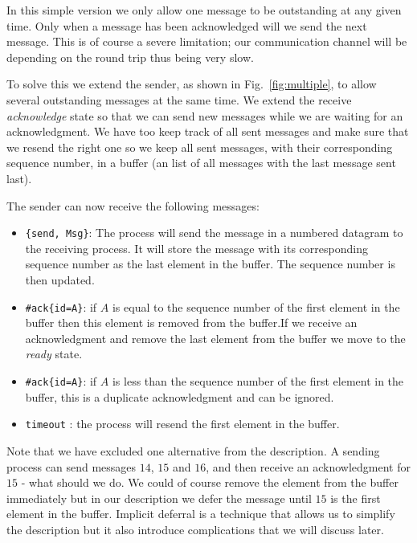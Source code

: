 \documentclass[a4paper,11pt]{article}
\begin{document}
In this simple version we only allow one message to be outstanding at
any given time. Only when a message has been acknowledged will we send
the next message. This is of course a severe limitation; our
communication channel will be depending on the round trip thus being
very slow.

To solve this we extend the sender, as shown in Fig.~\ref{fig:multiple}, to allow several outstanding
messages at the same time. We extend the receive {\em acknowledge}
state so that we can send new messages while we are waiting for an
acknowledgment. We have too keep track of all sent messages and make
sure that we resend the right one so we keep all sent messages, with
their corresponding sequence number, in a buffer (an list of all
messages with the last message sent last).

The sender can now receive the following messages:

\begin{itemize}
\item {\tt \{send, Msg\}}: The process will send the message in a
  numbered datagram to the receiving process. It will store the
  message with its corresponding sequence number as the last element in
  the buffer. The sequence number is then updated.

\item {\tt \#ack\{id=A\}}: if $A$
  is equal to the sequence number of the first element in the buffer
  then this element is removed from the buffer.If we receive an
  acknowledgment and remove the last element from the buffer we move
  to the {\em ready} state.

\item {\tt \#ack\{id=A\}}: if $A$
  is less than the sequence number of the first element in the buffer,
  this is a duplicate acknowledgment and can be ignored.

\item {\tt timeout} : the process will resend the first element in the buffer.

\end{itemize}


Note that we have excluded one alternative from the description. A
sending process can send messages $14$,
$15$
and $16$,
and then receive an acknowledgment for $15$
- what should we do. We could of course remove the element from the
buffer immediately but in our description we defer the message until
$15$
is the first element in the buffer. Implicit deferral is a technique
that allows us to simplify the description but it also introduce
complications that we will discuss later.
\end{document}
